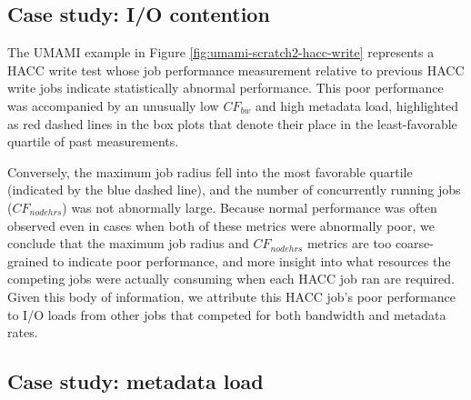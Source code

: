 {%
\subsection{Case study: I/O contention}

The UMAMI example in Figure \ref{fig:umami-scratch2-hacc-write} represents a HACC write test whose job performance measurement relative to previous HACC write jobs indicate statistically abnormal performance.
This poor performance was accompanied by an unusually low $\mathit{CF}_{\mathit{bw}}$ and high metadata load, highlighted as red dashed lines in the box plots that denote their place in the least-favorable quartile of past measurements.

Conversely, the maximum job radius fell into the most favorable quartile (indicated by the blue dashed line),
and the number of concurrently running jobs ($\mathit{CF}_{\mathit{nodehrs}}$) was not abnormally large.
Because normal performance was often observed even in cases when both of these metrics were abnormally poor, we conclude that the maximum job radius and $\mathit{CF}_{\mathit{nodehrs}}$ metrics are too coarse-grained to indicate poor performance, and
more insight into what resources the competing jobs were actually consuming when each HACC job ran are required.
Given this body of information, we attribute this HACC job's poor performance to I/O loads from other jobs that competed for both bandwidth and metadata rates.

\subsection{Case study: metadata load}

}
